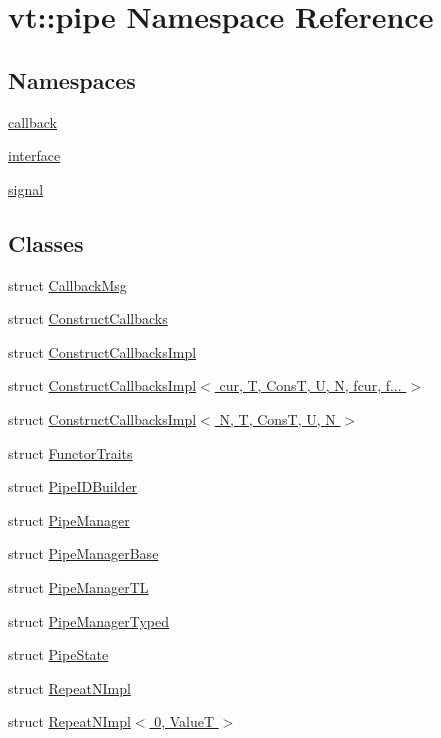 \hypertarget{namespacevt_1_1pipe}{}\section{vt\+:\+:pipe Namespace Reference}
\label{namespacevt_1_1pipe}
\subsection*{Namespaces}
\begin{DoxyCompactItemize}
\item 
 \hyperlink{namespacevt_1_1pipe_1_1callback}{callback}
\item 
 \hyperlink{namespacevt_1_1pipe_1_1interface}{interface}
\item 
 \hyperlink{namespacevt_1_1pipe_1_1signal}{signal}
\end{DoxyCompactItemize}
\subsection*{Classes}
\begin{DoxyCompactItemize}
\item 
struct \hyperlink{structvt_1_1pipe_1_1_callback_msg}{Callback\+Msg}
\item 
struct \hyperlink{structvt_1_1pipe_1_1_construct_callbacks}{Construct\+Callbacks}
\item 
struct \hyperlink{structvt_1_1pipe_1_1_construct_callbacks_impl}{Construct\+Callbacks\+Impl}
\item 
struct \hyperlink{structvt_1_1pipe_1_1_construct_callbacks_impl_3_01cur_00_01_t_00_01_cons_t_00_01_u_00_01_n_00_01fcur_00_01f_8_8_8_01_4}{Construct\+Callbacks\+Impl$<$ cur, T, Cons\+T, U, N, fcur, f... $>$}
\item 
struct \hyperlink{structvt_1_1pipe_1_1_construct_callbacks_impl_3_01_n_00_01_t_00_01_cons_t_00_01_u_00_01_n_01_4}{Construct\+Callbacks\+Impl$<$ N, T, Cons\+T, U, N $>$}
\item 
struct \hyperlink{structvt_1_1pipe_1_1_functor_traits}{Functor\+Traits}
\item 
struct \hyperlink{structvt_1_1pipe_1_1_pipe_i_d_builder}{Pipe\+I\+D\+Builder}
\item 
struct \hyperlink{structvt_1_1pipe_1_1_pipe_manager}{Pipe\+Manager}
\item 
struct \hyperlink{structvt_1_1pipe_1_1_pipe_manager_base}{Pipe\+Manager\+Base}
\item 
struct \hyperlink{structvt_1_1pipe_1_1_pipe_manager_t_l}{Pipe\+Manager\+TL}
\item 
struct \hyperlink{structvt_1_1pipe_1_1_pipe_manager_typed}{Pipe\+Manager\+Typed}
\item 
struct \hyperlink{structvt_1_1pipe_1_1_pipe_state}{Pipe\+State}
\item 
struct \hyperlink{structvt_1_1pipe_1_1_repeat_n_impl}{Repeat\+N\+Impl}
\item 
struct \hyperlink{structvt_1_1pipe_1_1_repeat_n_impl_3_010_00_01_value_t_01_4}{Repeat\+N\+Impl$<$ 0, Value\+T $>$}
\end{DoxyCompactItemize}
